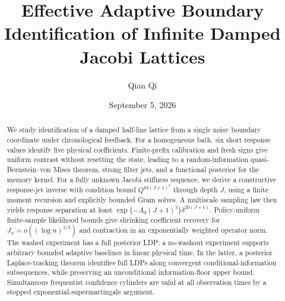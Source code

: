 \documentclass[11pt,reqno]{amsart}
\title[Effective adaptive Jacobi identification]{Effective Adaptive Boundary Identification of Infinite Damped Jacobi Lattices}
\author{Qian Qi}
\date{September 5, 2026}
\begin{document}
\begin{abstract}
We study identification of a damped half-line lattice from a single noisy
boundary coordinate under chronological feedback. For a homogeneous bath,
six short response values identify five physical coefficients. Finite-prefix
calibration and fresh signs give uniform contrast without resetting the
state, leading to a random-information quasi-Bernstein--von Mises theorem,
strong filter jets, and a functional posterior for the memory kernel.
For a fully unknown Jacobi stiffness sequence, we derive a constructive
response-jet inverse with condition bound \(Q^{64(J+1)^2}\) through depth
\(J\), using a finite moment recursion and explicitly bounded Gram solves.
A multiscale sampling law then yields response separation at least
\(\exp\{-A_0(J+1)^3\}\delta^{20(J+1)}\).
Policy-uniform finite-sample likelihood bounds give shrinking coefficient
recovery for \(J_n=o((\log n)^{1/3})\) and contraction in an exponentially
weighted operator norm. The washed experiment has a full posterior LDP;
a no-washout experiment supports arbitrary bounded adaptive baselines in
linear physical time. In the latter, a posterior Laplace-tracking theorem
identifies full LDPs along convergent conditional-information subsequences,
while preserving an unconditional information-floor upper bound.
Simultaneous frequentist confidence cylinders are valid at all observation
times by a stopped exponential-supermartingale argument.
\end{abstract}
\maketitle
\tableofcontents










\end{document}
